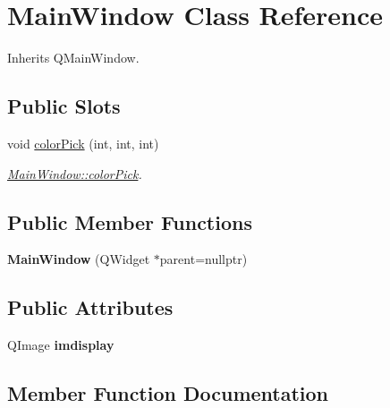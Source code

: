 \hypertarget{class_main_window}{}\section{Main\+Window Class Reference}
\label{class_main_window}


Inherits Q\+Main\+Window.

\subsection*{Public Slots}
\begin{DoxyCompactItemize}
\item 
void \mbox{\hyperlink{class_main_window_a07a79bd9461a6654eeeb16c6615356ac}{color\+Pick}} (int, int, int)
\begin{DoxyCompactList}\small\item\em \mbox{\hyperlink{class_main_window_a07a79bd9461a6654eeeb16c6615356ac}{Main\+Window\+::color\+Pick}}. \end{DoxyCompactList}\end{DoxyCompactItemize}
\subsection*{Public Member Functions}
\begin{DoxyCompactItemize}
\item 
\mbox{\label{class_main_window_a996c5a2b6f77944776856f08ec30858d}} 
{\bfseries Main\+Window} (Q\+Widget $\ast$parent=nullptr)
\end{DoxyCompactItemize}
\subsection*{Public Attributes}
\begin{DoxyCompactItemize}
\item 
\mbox{\label{class_main_window_a77c821305de94141fc8778681420518e}} 
Q\+Image {\bfseries imdisplay}
\end{DoxyCompactItemize}


\subsection{Member Function Documentation}
\mbox{\label{class_main_window_a07a79bd9461a6654eeeb16c6615356ac}} 
